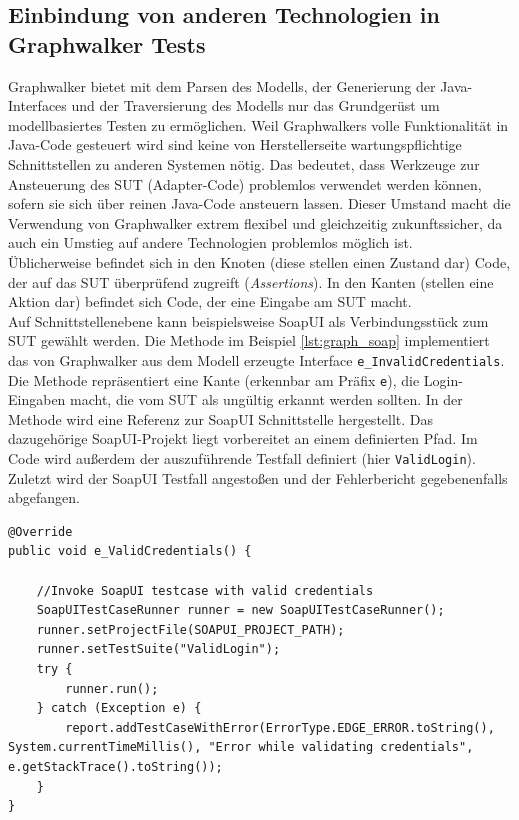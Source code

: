 \subsection{Einbindung von anderen Technologien in Graphwalker Tests}
Graphwalker bietet mit dem Parsen des Modells, der Generierung der Java-Interfaces und der Traversierung des Modells nur das Grundgerüst um modellbasiertes Testen zu ermöglichen. Weil Graphwalkers volle Funktionalität in Java-Code gesteuert wird sind keine von Herstellerseite wartungspflichtige Schnittstellen zu anderen Systemen nötig. Das bedeutet, dass Werkzeuge zur Ansteuerung des \Gls{SUT} (Adapter-Code) problemlos verwendet werden können, sofern sie sich über reinen Java-Code ansteuern lassen. Dieser Umstand macht die Verwendung von Graphwalker extrem flexibel und gleichzeitig zukunftssicher, da auch ein Umstieg auf andere Technologien problemlos möglich ist.\\
Üblicherweise befindet sich in den Knoten (diese stellen einen Zustand dar) Code, der auf das \Gls{SUT} überprüfend zugreift (\textit{Assertions}). In den Kanten (stellen eine Aktion dar) befindet sich Code, der eine Eingabe am \Gls{SUT} macht.\\
Auf Schnittstellenebene kann beispielsweise SoapUI als Verbindungsstück zum \Gls{SUT} gewählt werden. Die Methode im Beispiel \ref{lst:graph_soap} implementiert das von Graphwalker aus dem Modell erzeugte Interface \texttt{e\_InvalidCredentials}. Die Methode repräsentiert eine Kante (erkennbar am Präfix \texttt{e}), die Login-Eingaben macht, die vom \Gls{SUT} als ungültig erkannt werden sollten. In der Methode wird eine Referenz zur SoapUI Schnittstelle hergestellt. Das dazugehörige SoapUI-Projekt liegt vorbereitet an einem definierten Pfad. Im Code wird außerdem der auszuführende Testfall definiert (hier \texttt{ValidLogin}). Zuletzt wird der SoapUI Testfall angestoßen und der Fehlerbericht gegebenenfalls abgefangen.

\begin{lstlisting}[caption={Methode die ein von Graphwalker erzeugtes Interface implementiert und einen SoapUI-Testfall anstößt.}, label=lst:graph_soap]
@Override
public void e_ValidCredentials() {

    //Invoke SoapUI testcase with valid credentials
    SoapUITestCaseRunner runner = new SoapUITestCaseRunner();
    runner.setProjectFile(SOAPUI_PROJECT_PATH);
    runner.setTestSuite("ValidLogin");
    try {
        runner.run();
    } catch (Exception e) {
        report.addTestCaseWithError(ErrorType.EDGE_ERROR.toString(), System.currentTimeMillis(), "Error while validating credentials", e.getStackTrace().toString());
    }
}
\end{lstlisting}

